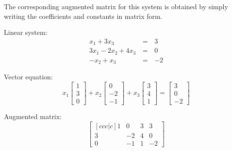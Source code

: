 \begin{example}
  The corresponding augmented matrix for this system is obtained by
  simply writing the coefficients and constants in matrix form.

  \begin{multicols}{2}
    Linear system:
    \begin{alignat*}{2}
       x_1 + 3x_3 &\,=\,& 3 \\
      3x_1 - 2x_2 + 4x_3 &\,=\,& 0 \\
      -x_2 +  x_3 &\,=\,& -2
    \end{alignat*}

    Vector equation:
\[ x_1 \begin{bmatrix} 1 \\ 3 \\ 0 \end{bmatrix}+ x_2 \begin{bmatrix} 0 \\ -2 \\ -1 \end{bmatrix} + x_3 \begin{bmatrix} 3 \\ 4 \\1 \end{bmatrix} = \begin{bmatrix} 3 \\ 0 \\ -2 \end{bmatrix}\]

    \columnbreak

    Augmented matrix:
    \[
      \begin{bmatrix}[ccc|c]
        1 & 0 & 3 & 3 \\
        3 & -2 & 4 & 0 \\
        0 & -1 & 1 & -2
      \end{bmatrix}
    \]
  \end{multicols}
\end{example}

